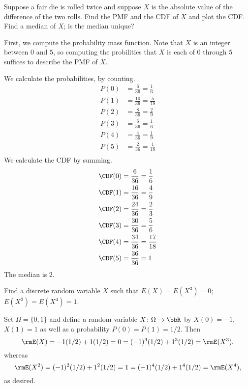 \begin{problem}[Handout 6, \# 5]
  Suppose a fair die is rolled twice and suppose \(X\) is the absolute
  value of the difference of the two rolls. Find the PMF and the CDF of
  \(X\) and plot the CDF. Find a median of \(X\); is the median unique?
\end{problem}
\begin{solution}
  First, we compute the probability mass function. Note that $X$ is an
  integer between $0$ and $5$, so computing the probilities that $X$ is
  each of $0$ through $5$ suffices to describe the PMF of $X$.

  We calculate the probabilities, by counting.
  \begin{align*}
    P(0) &= \frac{6}{36} = \frac{1}{6}\\
    P(1) &= \frac{10}{36} = \frac{5}{18}\\
    P(2) &= \frac{8}{36} = \frac{2}{9}\\
    P(3) &= \frac{6}{36} = \frac{1}{6}\\
    P(4) &= \frac{4}{36} = \frac{1}{9}\\
    P(5) &= \frac{2}{36} = \frac{1}{18}\\
  \end{align*}
  We calculate the CDF by summing.
  \begin{align*}
    \CDF(0) &= \frac{6}{36} = \frac{1}{6}\\
    \CDF(1) &= \frac{16}{36} = \frac{4}{9}\\
    \CDF(2) &= \frac{24}{36} = \frac{2}{3}\\
    \CDF(3) &= \frac{30}{36} = \frac{5}{6}\\
    \CDF(4) &= \frac{34}{36} = \frac{17}{18}\\
    \CDF(5) &= \frac{36}{36} = 1\\
  \end{align*}
  The median is $2$.
\end{solution}
\newpage

\begin{problem}[Handout 6, \# 7]
  Find a discrete random variable \(X\) such that \(E(X)=E(X^3)=0\);
  \(E(X^2)=E(X^4)=1\).
\end{problem}
\begin{solution}
  Set \(\Omega=\{0,1\}\) and define a random variable
  \(X\colon\Omega\to\bbR\) by \(X(0)= -1\), \(X(1)= 1\) as well as a
  probability \(P(0)=P(1)=1/2\). Then
  \[
    \rmE(X)=-1(1/2)+1(1/2)=0=(-1)^3(1/2)+1^3(1/2)=\rmE(X^3),
  \]
  whereas
  \[
    \rmE(X^2)=(-1)^2(1/2)+1^2(1/2)=1=(-1)^4(1/2)+1^4(1/2)=\rmE(X^4),
  \]
  as desired.
\end{solution}
\newpage

